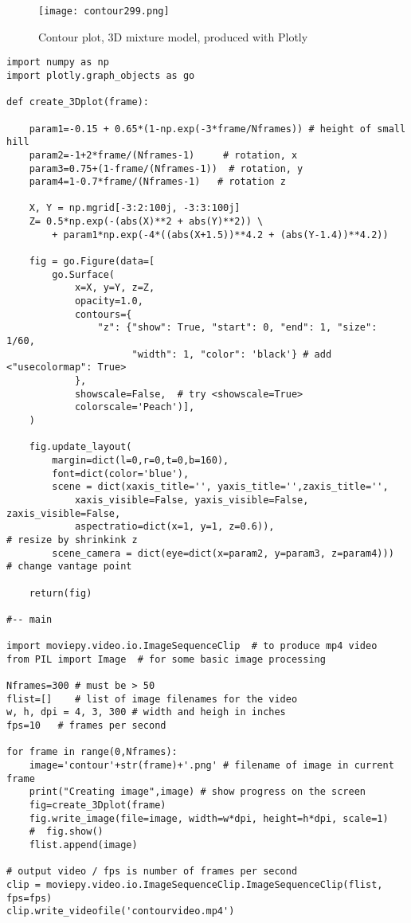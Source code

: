 \documentclass[oneside,10pt]{book}
\begin{document}
\begin{figure}[H]
\centering
\texttt{[image: contour299.png]}   
\caption{Contour plot, 3D mixture model, produced with Plotly}
\label{fig:screentr4x2998cv}
\end{figure}




\begin{lstlisting}
import numpy as np
import plotly.graph_objects as go

def create_3Dplot(frame):

    param1=-0.15 + 0.65*(1-np.exp(-3*frame/Nframes)) # height of small hill
    param2=-1+2*frame/(Nframes-1)     # rotation, x
    param3=0.75+(1-frame/(Nframes-1))  # rotation, y
    param4=1-0.7*frame/(Nframes-1)   # rotation z 

    X, Y = np.mgrid[-3:2:100j, -3:3:100j]
    Z= 0.5*np.exp(-(abs(X)**2 + abs(Y)**2)) \
        + param1*np.exp(-4*((abs(X+1.5))**4.2 + (abs(Y-1.4))**4.2))

    fig = go.Figure(data=[
        go.Surface(
            x=X, y=Y, z=Z,
            opacity=1.0,
            contours={
                "z": {"show": True, "start": 0, "end": 1, "size": 1/60,   
                      "width": 1, "color": 'black'} # add <"usecolormap": True>
            }, 
            showscale=False,  # try <showscale=True>
            colorscale='Peach')],
    )

    fig.update_layout(
        margin=dict(l=0,r=0,t=0,b=160),
        font=dict(color='blue'),
        scene = dict(xaxis_title='', yaxis_title='',zaxis_title='',
            xaxis_visible=False, yaxis_visible=False, zaxis_visible=False,
            aspectratio=dict(x=1, y=1, z=0.6)),                       # resize by shrinkink z
        scene_camera = dict(eye=dict(x=param2, y=param3, z=param4)))  # change vantage point  

    return(fig)

#-- main

import moviepy.video.io.ImageSequenceClip  # to produce mp4 video
from PIL import Image  # for some basic image processing

Nframes=300 # must be > 50
flist=[]    # list of image filenames for the video
w, h, dpi = 4, 3, 300 # width and heigh in inches
fps=10   # frames per second

for frame in range(0,Nframes): 
    image='contour'+str(frame)+'.png' # filename of image in current frame
    print("Creating image",image) # show progress on the screen
    fig=create_3Dplot(frame)
    fig.write_image(file=image, width=w*dpi, height=h*dpi, scale=1)
    #  fig.show()
    flist.append(image)

# output video / fps is number of frames per second
clip = moviepy.video.io.ImageSequenceClip.ImageSequenceClip(flist, fps=fps) 
clip.write_videofile('contourvideo.mp4')
\end{lstlisting}
\end{document}
